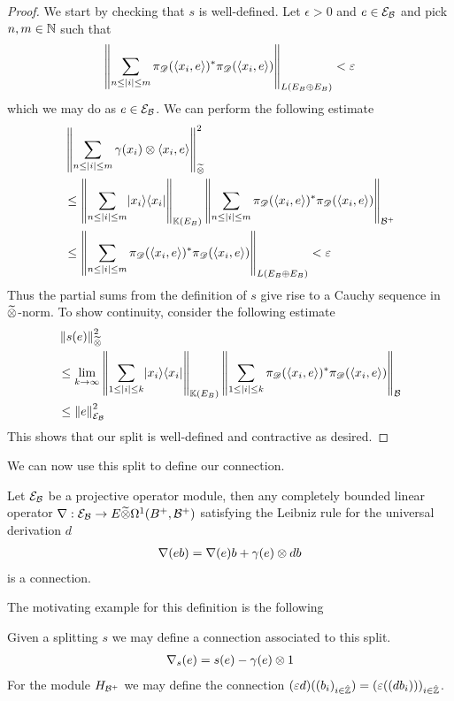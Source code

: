 \begin{proof}
	We start by checking that $s$ is well-defined. Let $\epsilon>0$ and $e\in \mathcal{E}_{\mathcal{B}}$ and pick $n,m\in \mathbb{N}$ such that 
	\begin{align*}
		\left \Vert \sum_{n\leq |i|\leq m} \pi_{\mathscr{D}}(\left \langle x_i,e \right \rangle)^*\pi_{\mathscr{D}}(\left \langle x_i,e \right \rangle) \right \Vert_{L(E_B\oplus E_B)}<\varepsilon
	\end{align*}
	which we may do as $e\in \mathcal{E}_{\mathcal{B}}$. 
	We can perform the following estimate
	\begin{align*}
		&\left \Vert \sum_{n\leq \left | i \right | \leq m} \gamma(x_i)\otimes \left \langle x_i,e \right \rangle \right \Vert^2_{\widetilde{\otimes}} \\
		&\leq \left \Vert \sum_{n\leq |i|\leq m} \lvert x_i \rangle\langle x_i \rvert \right \Vert_{\mathbb{K}(E_B)}\left \Vert \sum_{n\leq |i|\leq m}\pi_{\mathscr{D}}(\left \langle x_i,e \right \rangle)^*\pi_{\mathscr{D}}(\left \langle x_i,e \right \rangle) \right \Vert_{\mathcal{B}^+} \\
		&\leq \left \Vert \sum_{n\leq |i|\leq m} \pi_{\mathscr{D}}(\left \langle x_i,e \right \rangle)^*\pi_{\mathscr{D}}(\left \langle x_i,e \right \rangle) \right \Vert_{{L(E_B\oplus E_B)}}<\varepsilon
	\end{align*}
	Thus the partial sums from the definition of $s$ give rise to a Cauchy sequence in $\widetilde{\otimes}$-norm. To show continuity, consider the following estimate
	\begin{align*}
		&\left \Vert s(e) \right \Vert^2_{\widetilde{\otimes}} \\
		&\leq \lim_{k\to\infty} \left \Vert \sum_{1\leq |i|\leq k} \lvert x_i \rangle\langle x_i \rvert \right \Vert_{\mathbb{K}(E_B)} \left \Vert \sum_{1\leq |i|\leq k} \pi_{\mathscr{D}}(\left \langle x_i,e \right \rangle)^*\pi_{\mathscr{D}}(\left \langle x_i,e \right \rangle) \right \Vert_{\mathcal{B}} \\
		&\leq \left \Vert e \right \Vert_{\mathcal{E}_{\mathcal{B}}}^2
	\end{align*}
	This shows that our split is well-defined and contractive as desired. 
\end{proof}

We can now use this split to define our connection. 

\begin{definition}
	 Let $\mathcal{E}_{\mathcal{B}}$ be a projective operator module, then any completely bounded linear operator $\nabla: \mathcal{E}_{\mathcal{B}}\to E\widetilde{\otimes} \Omega^1(B^+,\mathcal{B}^+)$  satisfying the Leibniz rule for the universal derivation $d$
	\begin{align*}
		\nabla(eb)=\nabla(e)b+\gamma(e)\otimes db
	\end{align*}
	is a connection. 
\end{definition}
The motivating example for this definition is the following  
\begin{example}
	Given a splitting $s$ we may define a connection associated to this split.
	\begin{align*}
		\nabla_s(e)=s(e)-\gamma(e)\otimes 1
	\end{align*}
	For the module $H_{\mathcal{B}^+}$ we may define the connection $(\varepsilon d)((b_i)_{i\in \hat{\mathbb{Z}}})=(\varepsilon((d b_i)))_{i\in \hat{\mathbb{Z}}}$. 
\end{example}

